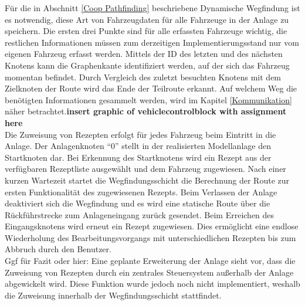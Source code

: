 			Für die in Abschnitt \ref{Coop Pathfinding} beschriebene Dynamische Wegfindung ist es notwendig, diese Art von Fahrzeugdaten für alle Fahrzeuge in der Anlage zu speichern. Die ersten drei Punkte sind für alle erfassten Fahrzeuge wichtig, die restlichen Informationen müssen zum derzeitigen Implementierungsstand nur vom eigenen Fahrzeug erfasst werden. Mittels der ID des letzten und des nächsten Knotens kann die Graphenkante identifiziert werden, auf der sich das Fahrzeug momentan befindet. Durch Vergleich des zuletzt besuchten Knotens mit dem Zielknoten der Route wird das Ende der Teilroute erkannt. Auf welchem Weg die benötigten Informationen gesammelt werden, wird im  Kapitel \ref{Kommunikation} näher betrachtet.\textbf{insert graphic of vehiclecontrolblock with assignment here}
			\\
			Die Zuweisung von Rezepten erfolgt für jedes Fahrzeug beim Eintritt in die Anlage. Der Anlagenknoten "`0"' stellt in der realisierten Modellanlage den Startknoten dar. Bei Erkennung des Startknotens wird ein Rezept aus der verfügbaren Rezeptliste ausgewählt und dem Fahrzeug zugewiesen. Nach einer kurzen Wartezeit startet die Wegfindungsschicht die Berechnung der Route zur ersten Funktionalität des zugewiesenen Rezepts. Beim Verlassen der Anlage deaktiviert sich die Wegfindung und es wird eine statische Route über die Rückführstrecke zum Anlageneingang zurück gesendet. Beim Erreichen des Eingangsknotens wird erneut ein Rezept zugewiesen. Dies ermöglicht eine endlose Wiederholung des Bearbeitungsvorgangs  mit unterschiedlichen Rezepten bis zum Abbruch durch den Benutzer.
			\\
			Ggf für Fazit oder hier: Eine geplante Erweiterung der Anlage sieht vor, dass die Zuweisung von Rezepten durch ein zentrales Steuersystem außerhalb der Anlage abgewickelt wird. Diese Funktion wurde jedoch noch nicht implementiert, weshalb die Zuweisung innerhalb der Wegfindungsschicht stattfindet.
			
		
